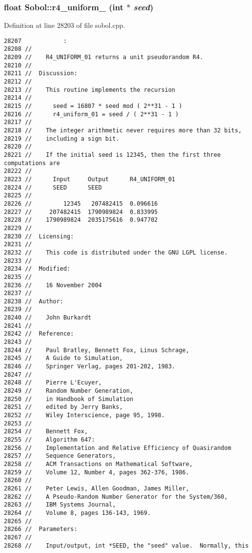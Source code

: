 \subsubsection{\setlength{\rightskip}{0pt plus 5cm}float Sobol::r4\_\-uniform\_ (int $\ast$ {\em seed})}\label{namespaceSobol_9a72897260280481cb6f55bea3875845}




Definition at line 28203 of file sobol.cpp.

\begin{Code}\begin{verbatim}28207            :
28208 //
28209 //    R4_UNIFORM_01 returns a unit pseudorandom R4.
28210 //
28211 //  Discussion:
28212 //
28213 //    This routine implements the recursion
28214 //
28215 //      seed = 16807 * seed mod ( 2**31 - 1 )
28216 //      r4_uniform_01 = seed / ( 2**31 - 1 )
28217 //
28218 //    The integer arithmetic never requires more than 32 bits,
28219 //    including a sign bit.
28220 //
28221 //    If the initial seed is 12345, then the first three computations are
28222 //
28223 //      Input     Output      R4_UNIFORM_01
28224 //      SEED      SEED
28225 //
28226 //         12345   207482415  0.096616
28227 //     207482415  1790989824  0.833995
28228 //    1790989824  2035175616  0.947702
28229 //
28230 //  Licensing:
28231 //
28232 //    This code is distributed under the GNU LGPL license. 
28233 //
28234 //  Modified:
28235 //
28236 //    16 November 2004
28237 //
28238 //  Author:
28239 //
28240 //    John Burkardt
28241 //
28242 //  Reference:
28243 //
28244 //    Paul Bratley, Bennett Fox, Linus Schrage,
28245 //    A Guide to Simulation,
28246 //    Springer Verlag, pages 201-202, 1983.
28247 //
28248 //    Pierre L'Ecuyer,
28249 //    Random Number Generation,
28250 //    in Handbook of Simulation
28251 //    edited by Jerry Banks,
28252 //    Wiley Interscience, page 95, 1998.
28253 //
28254 //    Bennett Fox,
28255 //    Algorithm 647:
28256 //    Implementation and Relative Efficiency of Quasirandom
28257 //    Sequence Generators,
28258 //    ACM Transactions on Mathematical Software,
28259 //    Volume 12, Number 4, pages 362-376, 1986.
28260 //
28261 //    Peter Lewis, Allen Goodman, James Miller,
28262 //    A Pseudo-Random Number Generator for the System/360,
28263 //    IBM Systems Journal,
28264 //    Volume 8, pages 136-143, 1969.
28265 //
28266 //  Parameters:
28267 //
28268 //    Input/output, int *SEED, the "seed" value.  Normally, this

\end{verbatim}
\end{Code}
